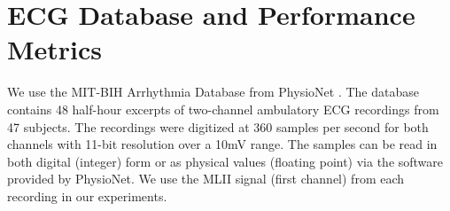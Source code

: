 \section{ECG Database and Performance Metrics}
\label{sec:data}

We use the MIT-BIH Arrhythmia Database \cite{moody2001impact}
from PhysioNet \cite{goldberger2000physiobank}.
The database contains 48 half-hour excerpts of two-channel
ambulatory ECG recordings from 47 subjects.
The recordings were digitized at 360 samples per second
for both channels with 11-bit resolution over a 10mV range.
The samples can be read in both digital (integer) form or
as physical values (floating point) via the software provided
by PhysioNet.
We use the MLII signal (first channel)
from each recording in our experiments.

